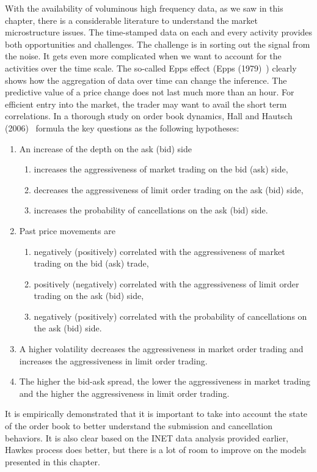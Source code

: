 With the availability of voluminous high frequency data, as we saw in this chapter, there is a considerable literature to understand the market microstructure issues. The time-stamped data on each and every activity provides both opportunities and challenges. The challenge is in sorting out the signal from the noise. It gets even more complicated when we want to account for the activities over the time scale. The so-called Epps effect (Epps (1979)~\cite{epps79}) clearly shows how the aggregation of data over time can change the inference. The predictive value of a price change does not last much more than an hour. For efficient entry into the market, the trader may want to avail the short term correlations. In a thorough study on order book dynamics, Hall and Hautsch (2006)~\cite{hallhautsch06} formula the key questions as the following hypotheses:
	\begin{enumerate}[(1)]
	\item An increase of the depth on the ask (bid) side
		\begin{enumerate}[--]
		\item increases the aggressiveness of market trading on the bid (ask) side,
		\item decreases the aggressiveness of limit order trading on the ask (bid) side,
		\item increases the probability of cancellations on the ask (bid) side.
		\end{enumerate}
	\item Past price movements are
		\begin{enumerate}[--]
		\item negatively (positively) correlated with the aggressiveness of market trading on the bid (ask) trade,
		\item positively (negatively) correlated with the aggressiveness of limit order trading on the ask (bid) side,
		\item negatively (positively) correlated with the probability of cancellations on the ask (bid) side.
		\end{enumerate}
	\item A higher volatility decreases the aggressiveness in market order trading and increases the aggressiveness in limit order trading.
	\item The higher the bid-ask spread, the lower the aggressiveness in market trading and the higher the aggressiveness in limit order trading. 
	\end{enumerate}
It is empirically demonstrated that it is important to take into account the state of the order book to better understand the submission and cancellation behaviors. It is also clear based on the INET data analysis provided earlier, Hawkes process does better, but there is a lot of room to improve on the models presented in this chapter.\label{in:labmod2}